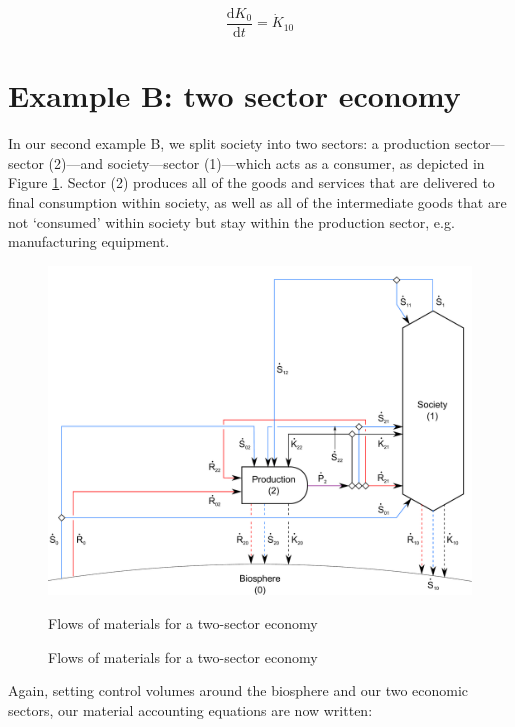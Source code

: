 \begin{equation} \label{eq:A_K0_balance}
	\frac{\mathrm{d}K_{0}}{\mathrm{d}t}		
	= \dot{K}_{10}
\end{equation}



\section{Example B: two sector economy}
\label{sec:B_materials}

In our second example B, we split society into two sectors: a production sector---sector (2)---and society---sector (1)---which acts as a consumer, as depicted in Figure \ref{fig:B_materials}. Sector (2) produces all of the goods and services that are delivered to final consumption within society, as well as all of the intermediate goods that are not `consumed' within society but stay within the production sector, e.g. manufacturing equipment.

\begin{figure}[h!]
\centering
\includegraphics[width=0.8\linewidth]{Part_1/Chapter_Materials/images/2_sector_materials.pdf}
\caption{Flows of materials for a two-sector economy}{Flows of materials for a two-sector economy}
\label{fig:B_materials}
\end{figure}

Again, setting control volumes around the biosphere and our two economic sectors, our material accounting equations are now written:


